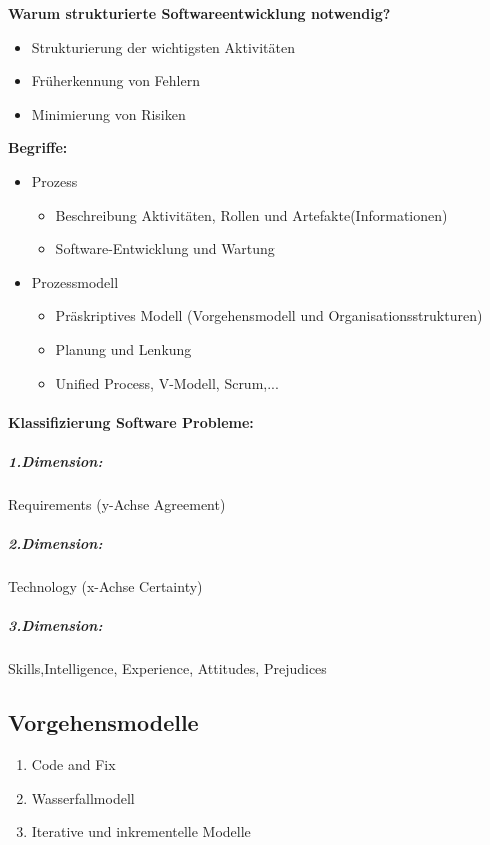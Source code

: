 \documentclass[../ZF_SWEN1.tex]{subfiles}
\begin{document}
\textbf {Warum strukturierte Softwareentwicklung notwendig?}
\begin{itemize}
	\item Strukturierung der wichtigsten Aktivitäten
	\item Früherkennung von Fehlern
	\item Minimierung von Risiken	
\end{itemize}
\textbf{Begriffe:}
\begin{itemize}
    \item Prozess
    \begin{itemize}
        \item Beschreibung Aktivitäten, Rollen und Artefakte(Informationen)
        \item Software-Entwicklung und Wartung
    \end{itemize}
    \item Prozessmodell
    \begin{itemize}
        \item Präskriptives Modell (Vorgehensmodell und Organisationsstrukturen)
        \item Planung und Lenkung
        \item Unified Process, V-Modell, Scrum,...
    \end{itemize}
\end{itemize}
\paragraph{Klassifizierung Software Probleme: \\}
\subparagraph{1.Dimension:} Requirements (y-Achse Agreement)
\subparagraph{2.Dimension:} Technology (x-Achse Certainty)
\subparagraph{3.Dimension:} Skills,Intelligence, Experience, Attitudes, Prejudices

\subsection{Vorgehensmodelle}
\begin{enumerate}
    \item Code and Fix
    \item Wasserfallmodell
    \item Iterative und inkrementelle Modelle
\end{enumerate}
\end{document}
